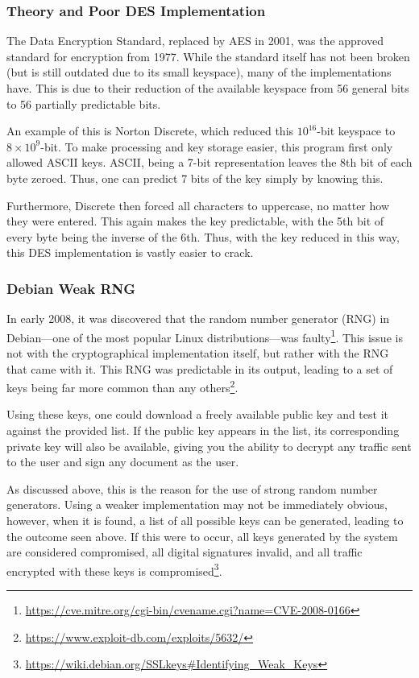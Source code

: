 			\subsubsection{Theory and Poor DES Implementation}
				The Data Encryption Standard, replaced by AES in 2001, was the approved standard for encryption from 1977. 
				While the standard itself has not been broken (but is still outdated due to its small keyspace), 
				many of the implementations have. 
				This is due to their reduction of the available keyspace from 56 general bits to 56 partially predictable bits.

				An example of this is Norton Discrete, which reduced this $10^{16}$-bit keyspace to $8\times10^9$-bit. 
				To make processing and key storage easier, this program first only allowed ASCII keys. 
				ASCII, being a 7-bit representation leaves the 8th bit of each byte zeroed. 
				Thus, one can predict 7 bits of the key simply by knowing this. 

				Furthermore, Discrete then forced all characters to uppercase, no matter how they were entered. 
				This again makes the key predictable, with the 5th bit of every byte being the inverse of the 6th. 
				Thus, with the key reduced in this way, this DES implementation is vastly easier to crack. 

			\subsubsection{Debian Weak RNG}
				In early 2008, it was discovered that the random number generator (RNG) in Debian---one of the most popular Linux distributions---was faulty\footnote{\url{https://cve.mitre.org/cgi-bin/cvename.cgi?name=CVE-2008-0166}}.
				This issue is not with the cryptographical implementation itself, but rather with the RNG that came with it. 
				This RNG was predictable in its output, leading to a set of keys being far more common than any others\footnote{\url{https://www.exploit-db.com/exploits/5632/}}.

				Using these keys, one could download a freely available public key and test it against the provided list. 
				If the public key appears in the list, its corresponding private key will also be available, giving you the ability to decrypt any traffic sent to the user and sign any document as the user. 

				As discussed above, this is the reason for the use of strong random number generators. 
				Using a weaker implementation may not be immediately obvious, 
				however, when it is found, a list of all possible keys can be generated, leading to the outcome seen above. 
				If this were to occur, all keys generated by the system are considered compromised, all digital signatures invalid, and all traffic encrypted with these keys is compromised\footnote{\url{https://wiki.debian.org/SSLkeys\#Identifying\_Weak\_Keys}}.

